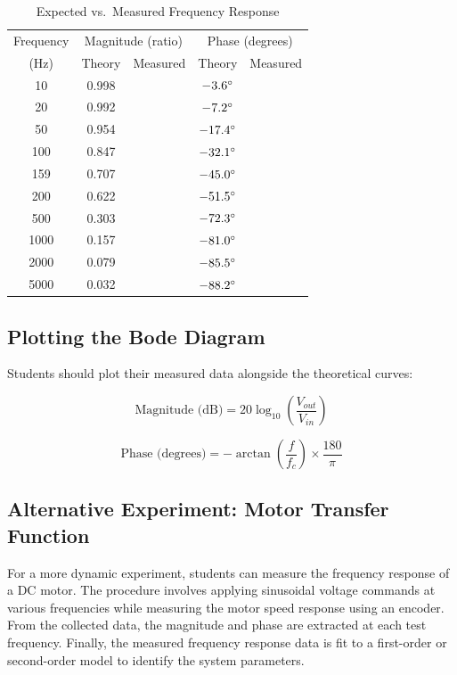 \begin{table}[htbp]
\centering
\caption{Expected vs.\ Measured Frequency Response}
\label{tab:freq_response}
\begin{tabular}{ccccc}
\toprule
Frequency & \multicolumn{2}{c}{Magnitude (ratio)} & \multicolumn{2}{c}{Phase (degrees)} \\
(Hz) & Theory & Measured & Theory & Measured \\
\midrule
10 & 0.998 & & $-3.6^\circ$ & \\
20 & 0.992 & & $-7.2^\circ$ & \\
50 & 0.954 & & $-17.4^\circ$ & \\
100 & 0.847 & & $-32.1^\circ$ & \\
159 & 0.707 & & $-45.0^\circ$ & \\
200 & 0.622 & & $-51.5^\circ$ & \\
500 & 0.303 & & $-72.3^\circ$ & \\
1000 & 0.157 & & $-81.0^\circ$ & \\
2000 & 0.079 & & $-85.5^\circ$ & \\
5000 & 0.032 & & $-88.2^\circ$ & \\
\bottomrule
\end{tabular}
\end{table}

\subsection{Plotting the Bode Diagram}

Students should plot their measured data alongside the theoretical curves:

\begin{equation}
\text{Magnitude (dB)} = 20\log_{10}\left(\frac{V_{out}}{V_{in}}\right)
\end{equation}

\begin{equation}
\text{Phase (degrees)} = -\arctan\left(\frac{f}{f_c}\right) \times \frac{180}{\pi}
\end{equation}

\subsection{Alternative Experiment: Motor Transfer Function}

For a more dynamic experiment, students can measure the frequency response of a DC motor. The procedure involves applying sinusoidal voltage commands at various frequencies while measuring the motor speed response using an encoder. From the collected data, the magnitude and phase are extracted at each test frequency. Finally, the measured frequency response data is fit to a first-order or second-order model to identify the system parameters.

